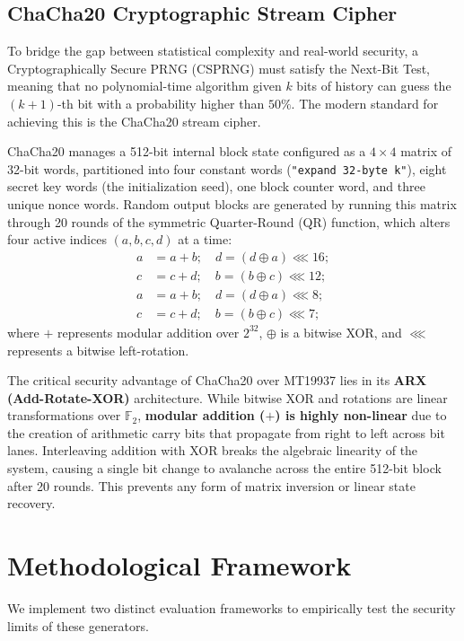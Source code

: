 \documentclass[twocolumn,10pt]{article}
\begin{document}
\subsection{ChaCha20 Cryptographic Stream Cipher}
To bridge the gap between statistical complexity and real-world security, a Cryptographically Secure PRNG (CSPRNG) must satisfy the Next-Bit Test, meaning that no polynomial-time algorithm given $k$ bits of history can guess the $(k+1)$-th bit with a probability higher than $50\%$. The modern standard for achieving this is the ChaCha20 stream cipher.

ChaCha20 manages a 512-bit internal block state configured as a $4 \times 4$ matrix of 32-bit words, partitioned into four constant words (\texttt{"expand 32-byte k"}), eight secret key words (the initialization seed), one block counter word, and three unique nonce words. Random output blocks are generated by running this matrix through 20 rounds of the symmetric Quarter-Round (QR) function, which alters four active indices $(a, b, c, d)$ at a time:
\begin{align}
a &= a + b; \quad d = (d \oplus a) \lll 16; \\
c &= c + d; \quad b = (b \oplus c) \lll 12; \\
a &= a + b; \quad d = (d \oplus a) \lll 8; \\
c &= c + d; \quad b = (b \oplus c) \lll 7;
\end{align}
where $+$ represents modular addition over $2^{32}$, $\oplus$ is a bitwise XOR, and $\lll$ represents a bitwise left-rotation.

The critical security advantage of ChaCha20 over MT19937 lies in its \textbf{ARX (Add-Rotate-XOR)} architecture. While bitwise XOR and rotations are linear transformations over $\mathbb{F}_2$, \textbf{modular addition ($+$) is highly non-linear} due to the creation of arithmetic carry bits that propagate from right to left across bit lanes. Interleaving addition with XOR breaks the algebraic linearity of the system, causing a single bit change to avalanche across the entire 512-bit block after 20 rounds. This prevents any form of matrix inversion or linear state recovery.

\section{Methodological Framework}
We implement two distinct evaluation frameworks to empirically test the security limits of these generators.
\end{document}
